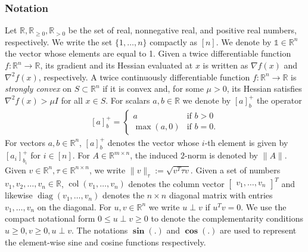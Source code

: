 \documentclass[journal]{IEEEtran}
\newcommand{\1}{\mathds 1}
\newcommand{\p}{\partial}
\newcommand{\n}{\nabla}
\newcommand{\integerspositive}{\mathbb{Z}_{\geq 1}}
\newcommand{\ddiag}[1]{\diag{(#1)}}
\newcommand{\real}{\mathbb{R}}
\newcommand{\norm}[1]{\ensuremath{\| #1 \|}}
\newcommand{\until}[1]{[#1]}
\newcommand{\map}[3]{#1:#2 \rightarrow #3}
\newcommand{\pproj}[2]{[#1]^+_{#2}}
\DeclareMathOperator{\col}{col}
\DeclareMathOperator{\diag}{diag}
\DeclareMathOperator{\Sin}{\mathbf{sin}}
\DeclareMathOperator{\Cos}{\mathbf{cos}}
\theoremstyle{remark}
\theoremstyle{definition}
\begin{document}
\subsubsection*{Notation} 
Let $\mathbb R , \mathbb R_{\ge0} , \mathbb R_{>0}$
be the set of real, nonnegative real, and positive real numbers, respectively.
We write the set $\{1,\ldots,n\}$ compactly as $\until{n}$. We denote
by $\1\in\mathbb R^n$ the vector whose elements are equal to 1. Given
a twice differentiable function $\map{f}{\real^n}{\real}$, its
gradient and its Hessian evaluated at $x$ is written as $\nabla f(x)$
and $\n^2f(x)$,
respectively. %
A twice continuously differentiable function $\map{f}{\real^n}{\real}$
is \emph{strongly convex} on $S\subset \real^n$ if it is convex and,
for some $\mu>0$, its Hessian satisfies $\n^2f(x)>\mu I$ for all $x\in
S$. For scalars $a,b\in\mathbb R$ we denote by $\pproj{a}{b}$ the
operator
\begin{align}\label{eq:projection}
  \pproj{a}{b}=
  \begin{cases}
    a & \text{if } b>0\\
    \max(a,0) & \text{if } b=0.
  \end{cases}
\end{align}
For vectors $a,b\in\real^n$, $\pproj{a}{b}$ denotes the vector whose $i$-th element is given by $\pproj{a_i}{b_i}$ for $i\in[n]$. For $A\in\mathbb R^{m\times n}$, the induced $2$-norm is denoted by $\norm{A}$. Given $v\in\mathbb R^n,\tau\in\mathbb R^{n\times n}$, we write $\|v\|_\tau:=\sqrt{v^T\tau v}$.  Given a set of numbers $v_1,v_2,\ldots,v_n \in \real$, $\col(v_1,\ldots,v_n)$ denotes the column vector $\begin{bmatrix} v_1, \dots, v_n \end{bmatrix}^T $ and likewise $\diag(v_1,\ldots,v_n)$ denotes the $n\times n$ diagonal matrix with entries $v_1,\ldots,v_n$ on the diagonal. For $u,v\in\mathbb R^n$ we write $u\perp v$ if $u^Tv=0$. We use the compact notational form $0\leq u\perp v\geq 0$ to denote the complementarity conditions $u\geq0,v\geq 0, u\perp v$. The notations $\Sin(.)$ and $\Cos(.)$ are used to represent the element-wise sine and cosine functions respectively.
\end{document}
